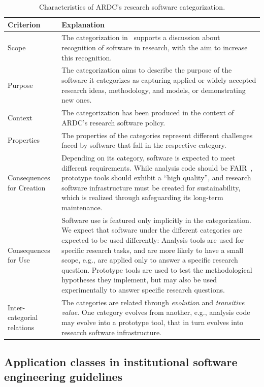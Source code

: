 \documentclass{IEEEcsmag}
\begin{document}
\begin{table}[]
    \centering
    \begin{tabularx}{\textwidth}{l X}
    \toprule
        Criterion & Explanation \\
    \midrule
        Scope & The categorization in~\cite{ARDC2022} supports a discussion about recognition of software in research, with the aim to increase this recognition. \\
        Purpose & The categorization aims to describe the purpose of the software it categorizes as capturing applied or widely accepted research ideas, methodology, and models, or demonstrating new ones. \\
        Context & The categorization has been produced in the context of ARDC's research software policy. \\
        Properties & The properties of the categories represent different challenges faced by software that fall in the respective category. \\
        Consequences for Creation & Depending on its category, software is expected to meet different requirements. 
While analysis code should be FAIR~\cite{FAIR4RS2022}, prototype tools should exhibit a ``high quality'', and research software infrastructure must be created for sustainability, which is realized through safeguarding its long-term maintenance. \\
        Consequences for Use & Software use is featured only implicitly in the categorization.
We expect that software under the different categories are expected to be used differently:
Analysis tools are used for specific research tasks, and are more likely to have a small scope, e.g.,
are applied only to answer a specific research question.
Prototype tools are used to test the methodological hypotheses they implement,
but may also be used experimentally to answer specific research questions.\\
        Inter-categorial relations & The categories are related through \textit{evolution} and \textit{transitive value}. One category evolves from another, e.g., analysis code may evolve into a prototype tool,
that in turn evolves into research software infrastructure.\\
    \bottomrule
    \end{tabularx}
    \caption{Characteristics of ARDC's research software categorization.}
    \label{table:ARDC-categorization}
\end{table}

\subsection{Application classes in institutional software engineering guidelines}
\end{document}
